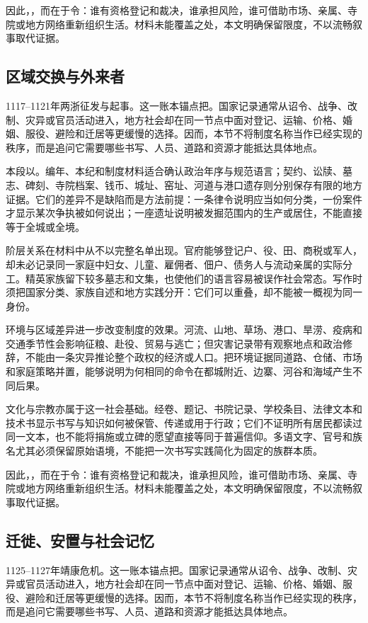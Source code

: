因此，，而在于令：谁有资格登记和裁决，谁承担风险，谁可借助市场、亲属、寺院或地方网络重新组织生活。材料未能覆盖之处，本文明确保留限度，不以流畅叙事取代证据。

\subsection{区域交换与外来者}

1117--1121年两浙征发与起事。这一账本锚点把。国家记录通常从诏令、战争、改制、灾异或官员活动进入，地方社会却在同一节点中面对登记、运输、价格、婚姻、服役、避险和迁居等更缓慢的选择。因而，本节不将制度名称当作已经实现的秩序，而是追问它需要哪些书写、人员、道路和资源才能抵达具体地点。

本段以。编年、本纪和制度材料适合确认政治年序与规范语言；契约、讼牍、墓志、碑刻、寺院档案、钱币、城址、窑址、河道与港口遗存则分别保存有限的地方证据。它们的差异不是缺陷而是方法前提：一条律令说明应当如何分类，一份案件才显示某次争执被如何说出；一座遗址说明被发掘范围内的生产或居住，不能直接等于全城或全境。

阶层关系在材料中从不以完整名单出现。官府能够登记户、役、田、商税或军人，却未必记录同一家庭中妇女、儿童、雇佣者、佃户、债务人与流动亲属的实际分工。精英家族留下较多墓志和文集，也使他们的语言容易被误作社会常态。写作时须把国家分类、家族自述和地方实践分开：它们可以重叠，却不能被一概视为同一身份。

环境与区域差异进一步改变制度的效果。河流、山地、草场、港口、旱涝、疫病和交通季节性会影响征粮、赴役、贸易与逃亡；但灾害记录带有观察地点和政治修辞，不能由一条灾异推论整个政权的经济或人口。把环境证据同道路、仓储、市场和家庭策略并置，能够说明为何相同的命令在都城附近、边寨、河谷和海域产生不同后果。

文化与宗教亦属于这一社会基础。经卷、题记、书院记录、学校条目、法律文本和技术书显示书写与知识如何被保管、传递或用于行政；它们不证明所有居民都读过同一文本，也不能将捐施或立碑的愿望直接等同于普遍信仰。多语文字、官号和族名尤其必须保留原始语境，不能把一次书写实践简化为固定的族群本质。

因此，，而在于令：谁有资格登记和裁决，谁承担风险，谁可借助市场、亲属、寺院或地方网络重新组织生活。材料未能覆盖之处，本文明确保留限度，不以流畅叙事取代证据。

\subsection{迁徙、安置与社会记忆}

1125--1127年靖康危机。这一账本锚点把。国家记录通常从诏令、战争、改制、灾异或官员活动进入，地方社会却在同一节点中面对登记、运输、价格、婚姻、服役、避险和迁居等更缓慢的选择。因而，本节不将制度名称当作已经实现的秩序，而是追问它需要哪些书写、人员、道路和资源才能抵达具体地点。

